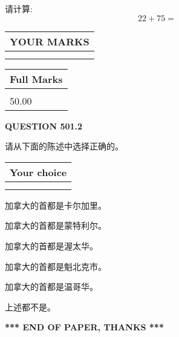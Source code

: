 \documentclass{ctexart}
\begin{document}
  
 
请计算:
\begin{equation}
22 +  %
75 = \nonumber
\end{equation}
 

 

 
  
\vspace{0.2in}
  
\noindent\begin{tabular}{|l|}
\hline
 YOUR MARKS  \\
\hline
 \\ 
 \\ 
\hline
\end{tabular}
\hspace{0.05in} \begin{tabular}{|l|}
\hline
 Full Marks  \\
\hline
 \\ 
50.00 \\
\hline
\end{tabular}
{\textbf{\Large{QUESTION
501.2 
}}}
  
  
请从下面的陈述中选择正确的。
  
  
\noindent\hspace{3.0in} \begin{tabular}{|l|}
\hline
Your choice \\
\hline
 \\ 
 \\ 
\hline
\end{tabular}
  
  
 
 
加拿大的首都是卡尔加里。
 
 
加拿大的首都是蒙特利尔。
 
 
加拿大的首都是渥太华。
 
 
加拿大的首都是魁北克市。
 
 
加拿大的首都是温哥华。
 
 
 上述都不是。
 
 
   
   
 \vspace{0.2in}
 
   
   
   
   
\vspace{1.0in} 
{\textbf{\large{ *** END OF PAPER, THANKS *** }}} 
   
\end{document}
